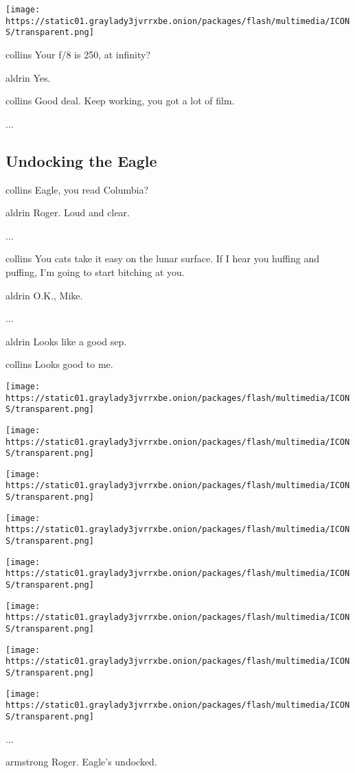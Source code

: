 \texttt{[image: https://static01.graylady3jvrrxbe.onion/packages/flash/multimedia/ICONS/transparent.png]}

collins Your f/8 is 250, at infinity?

aldrin Yes.

collins Good deal. Keep working, you got a lot of film.

...

\hypertarget{-undocking-the-eagle-}{%
\subsection{ Undocking the Eagle }\label{-undocking-the-eagle-}}

collins Eagle, you read Columbia?

aldrin Roger. Loud and clear.

...

collins You cats take it easy on the lunar surface. If I hear you
huffing and puffing, I'm going to start bitching at you.

aldrin O.K., Mike.

...

aldrin Looks like a good sep.

collins Looks good to me.

\texttt{[image: https://static01.graylady3jvrrxbe.onion/packages/flash/multimedia/ICONS/transparent.png]}

\texttt{[image: https://static01.graylady3jvrrxbe.onion/packages/flash/multimedia/ICONS/transparent.png]}

\texttt{[image: https://static01.graylady3jvrrxbe.onion/packages/flash/multimedia/ICONS/transparent.png]}

\texttt{[image: https://static01.graylady3jvrrxbe.onion/packages/flash/multimedia/ICONS/transparent.png]}

\texttt{[image: https://static01.graylady3jvrrxbe.onion/packages/flash/multimedia/ICONS/transparent.png]}

\texttt{[image: https://static01.graylady3jvrrxbe.onion/packages/flash/multimedia/ICONS/transparent.png]}

\texttt{[image: https://static01.graylady3jvrrxbe.onion/packages/flash/multimedia/ICONS/transparent.png]}

\texttt{[image: https://static01.graylady3jvrrxbe.onion/packages/flash/multimedia/ICONS/transparent.png]}

...

armstrong Roger. Eagle's undocked.

